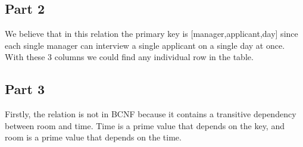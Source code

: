 \documentclass[a4paper,12pt]{article}
\begin{document}
\subsection{Part 2}
We believe that in this relation the primary key is [manager,applicant,day] since each single manager can interview a single applicant on a single day at once. With these 3 columns we could find any individual row in the table.

\subsection{Part 3}
Firstly, the relation is not in BCNF because it contains a transitive dependency between room and time. Time is a prime value that depends on the key, and room is a prime value that depends on the time.
\end{document}
